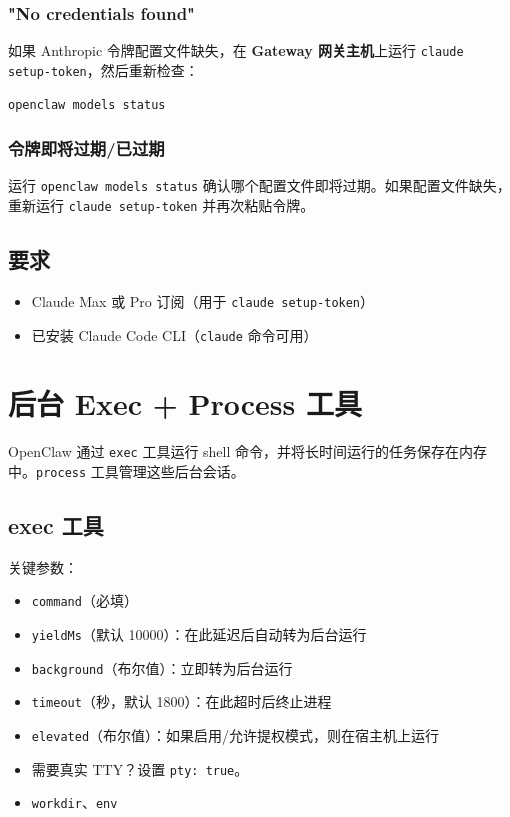 \subsubsection{"No credentials found"}


如果 Anthropic 令牌配置文件缺失，在 \textbf{Gateway 网关主机}上运行 \texttt{claude setup-token}，然后重新检查：

\begin{lstlisting}[language=bash]
openclaw models status
\end{lstlisting}


\subsubsection{令牌即将过期/已过期}


运行 \texttt{openclaw models status} 确认哪个配置文件即将过期。如果配置文件缺失，重新运行 \texttt{claude setup-token} 并再次粘贴令牌。

\subsection{要求}


\begin{itemize}
  \item Claude Max 或 Pro 订阅（用于 \texttt{claude setup-token}）
  \item 已安装 Claude Code CLI（\texttt{claude} 命令可用）
\end{itemize}



\clearpage

\section{后台 Exec + Process 工具}


OpenClaw 通过 \texttt{exec} 工具运行 shell 命令，并将长时间运行的任务保存在内存中。\texttt{process} 工具管理这些后台会话。

\subsection{exec 工具}


关键参数：

\begin{itemize}
  \item \texttt{command}（必填）
  \item \texttt{yieldMs}（默认 10000）：在此延迟后自动转为后台运行
  \item \texttt{background}（布尔值）：立即转为后台运行
  \item \texttt{timeout}（秒，默认 1800）：在此超时后终止进程
  \item \texttt{elevated}（布尔值）：如果启用/允许提权模式，则在宿主机上运行
  \item 需要真实 TTY？设置 \texttt{pty: true}。
  \item \texttt{workdir}、\texttt{env}
\end{itemize}


